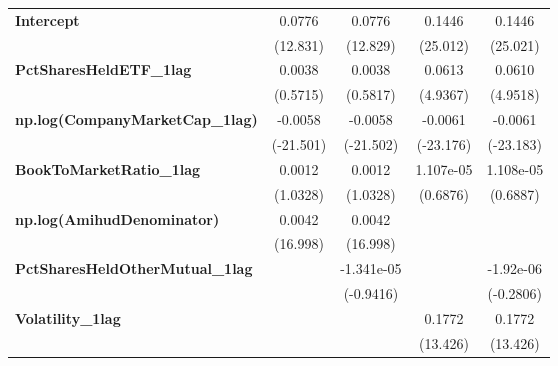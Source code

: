 {\begin{longtable}{>{\bfseries}lcccc}
\textbf{Intercept}                         &        0.0776       &             0.0776             &        0.1446       &              0.1446              \\
\textbf{ }                                 &       (12.831)      &            (12.829)            &       (25.012)      &             (25.021)             \\
\textbf{PctSharesHeldETF\_1lag}            &        0.0038       &             0.0038             &        0.0613       &              0.0610              \\
\textbf{ }                                 &       (0.5715)      &            (0.5817)            &       (4.9367)      &             (4.9518)             \\
\textbf{np.log(CompanyMarketCap\_1lag)}    &       -0.0058       &            -0.0058             &       -0.0061       &             -0.0061              \\
\textbf{ }                                 &      (-21.501)      &           (-21.502)            &      (-23.176)      &            (-23.183)             \\
\textbf{BookToMarketRatio\_1lag}           &        0.0012       &             0.0012             &      1.107e-05      &            1.108e-05             \\
\textbf{ }                                 &       (1.0328)      &            (1.0328)            &       (0.6876)      &             (0.6887)             \\
\textbf{np.log(AmihudDenominator)}         &        0.0042       &             0.0042             &                     &                                  \\
\textbf{ }                                 &       (16.998)      &            (16.998)            &                     &                                  \\
\textbf{PctSharesHeldOtherMutual\_1lag}    &                     &           -1.341e-05           &                     &            -1.92e-06             \\
\textbf{ }                                 &                     &           (-0.9416)            &                     &            (-0.2806)             \\
\textbf{Volatility\_1lag}                  &                     &                                &        0.1772       &              0.1772              \\
\textbf{ }                                 &                     &                                &       (13.426)      &             (13.426)             \\

\end{longtable}}
